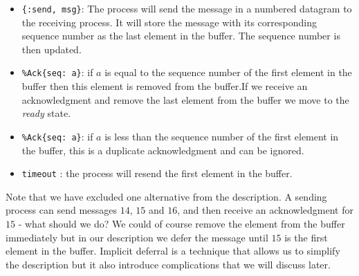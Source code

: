 \documentclass[a4paper,11pt]{article}
\begin{document}
\begin{itemize}
\item {\tt \{:send, msg\}}: The process will send the message in a
  numbered datagram to the receiving process. It will store the
  message with its corresponding sequence number as the last element in
  the buffer. The sequence number is then updated.

\item {\tt \%Ack\{seq: a\}}: if $a$
  is equal to the sequence number of the first element in the buffer
  then this element is removed from the buffer.If we receive an
  acknowledgment and remove the last element from the buffer we move
  to the {\em ready} state.

\item {\tt \%Ack\{seq: a\}}: if $a$ is less than the sequence number
  of the first element in the buffer, this is a duplicate
  acknowledgment and can be ignored.

\item {\tt timeout} : the process will resend the first element in the buffer.

\end{itemize}


Note that we have excluded one alternative from the description. A
sending process can send messages $14$, $15$ and $16$,
and then receive an acknowledgment for $15$
- what should we do? We could of course remove the element from the
buffer immediately but in our description we defer the message until
$15$ is the first element in the buffer. Implicit deferral is a technique
that allows us to simplify the description but it also introduce
complications that we will discuss later.
\end{document}
